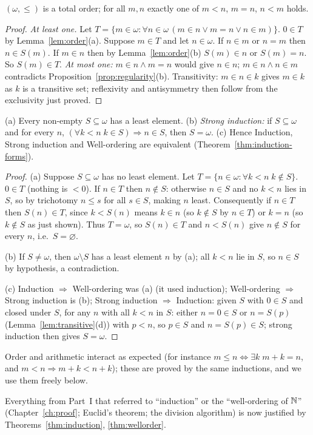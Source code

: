 \begin{theorem}\label{thm:trichotomy}
	$(\omega,\le)$ is a total order; for all $m,n$ exactly one of $m<n$, $m=n$, $n<m$ holds.
\end{theorem}
\begin{proof}
	\emph{At least one.} Let $T=\{m\in\omega:\forall n\in\omega\,(m\in n\vee m=n\vee n\in m)\}$. $0\in T$ by Lemma~\ref{lem:order}(a). Suppose $m\in T$ and let $n\in\omega$. If $n\in m$ or $n=m$ then $n\in S(m)$. If $m\in n$ then by Lemma~\ref{lem:order}(b) $S(m)\in n$ or $S(m)=n$. So $S(m)\in T$. \emph{At most one:} $m\in n\wedge m=n$ would give $n\in n$; $m\in n\wedge n\in m$ contradicts Proposition~\ref{prop:regularity}(b). Transitivity: $m\in n\in k$ gives $m\in k$ as $k$ is a transitive set; reflexivity and antisymmetry then follow from the exclusivity just proved.
\end{proof}

\begin{theorem}\label{thm:wellorder}
	(a) Every non-empty $S\subseteq\omega$ has a least element. (b) \emph{Strong induction:} if $S\subseteq\omega$ and for every $n$, $(\forall k<n\;k\in S)\Rightarrow n\in S$, then $S=\omega$. (c) Hence Induction, Strong induction and Well-ordering are equivalent (Theorem~\ref{thm:induction-forms}).
\end{theorem}
\begin{proof}
	(a) Suppose $S\subseteq\omega$ has no least element. Let $T=\{n\in\omega:\forall k<n\;k\notin S\}$. $0\in T$ (nothing is $<0$). If $n\in T$ then $n\notin S$: otherwise $n\in S$ and no $k<n$ lies in $S$, so by trichotomy $n\le s$ for all $s\in S$, making $n$ least. Consequently if $n\in T$ then $S(n)\in T$, since $k<S(n)$ means $k\in n$ (so $k\notin S$ by $n\in T$) or $k=n$ (so $k\notin S$ as just shown). Thus $T=\omega$, so $S(n)\in T$ and $n<S(n)$ give $n\notin S$ for every $n$, i.e.\ $S=\varnothing$.
	
	(b) If $S\neq\omega$, then $\omega\setminus S$ has a least element $n$ by (a); all $k<n$ lie in $S$, so $n\in S$ by hypothesis, a contradiction.
	
	(c) Induction $\Rightarrow$ Well-ordering was (a) (it used induction); Well-ordering $\Rightarrow$ Strong induction is (b); Strong induction $\Rightarrow$ Induction: given $S$ with $0\in S$ and closed under $S$, for any $n$ with all $k<n$ in $S$: either $n=0\in S$ or $n=S(p)$ (Lemma~\ref{lem:transitive}(d)) with $p<n$, so $p\in S$ and $n=S(p)\in S$; strong induction then gives $S=\omega$.
\end{proof}

Order and arithmetic interact as expected (for instance $m\le n\iff\exists k\;m+k=n$, and $m<n\Rightarrow m+k<n+k$); these are proved by the same inductions, and we use them freely below.

\begin{remark}
	Everything from Part~I that referred to ``induction'' or the ``well-ordering of $\mathbb{N}$'' (Chapter~\ref{ch:proof}; Euclid's theorem; the division algorithm) is now justified by Theorems~\ref{thm:induction}, \ref{thm:wellorder}.
\end{remark}